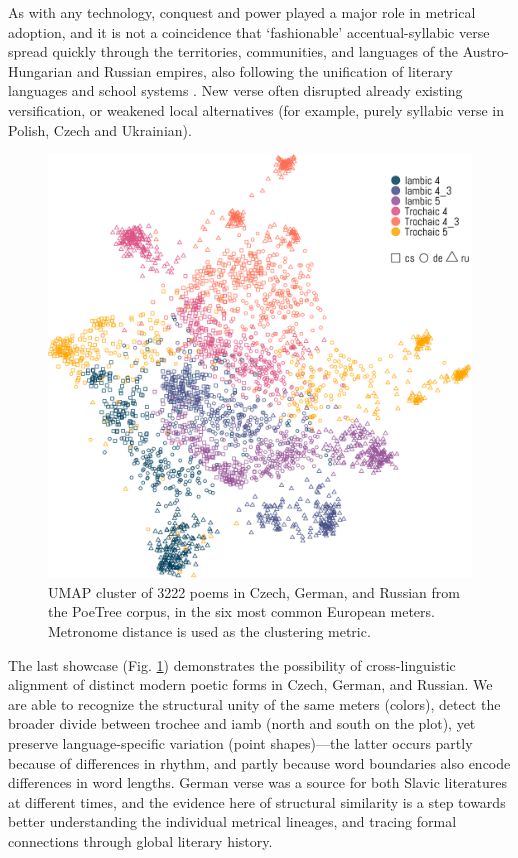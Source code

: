 \documentclass[
    hf
]{ceurart}
\begin{document}
As with any technology, conquest and power played a major role in metrical adoption, and it is not a coincidence that `fashionable' accentual-syllabic verse spread quickly through the territories, communities, and languages of the Austro-Hungarian and Russian empires, also following the unification of literary languages and school systems \cite[238-239]{gasparov_history_1996}. New verse often disrupted already existing versification, or weakened local alternatives (for example, purely syllabic verse in Polish, Czech and Ukrainian).

\begin{figure}
    \includegraphics[width=\linewidth]{figures/crosslang_cluster-crop.pdf}
    \caption{UMAP cluster of 3222 poems in Czech, German, and Russian from the PoeTree corpus, in the six most common European meters. Metronome distance is used as the clustering metric.}
    \label{fig:crosslang}
\end{figure}

The last showcase (Fig. \ref{fig:crosslang}) demonstrates the possibility of cross-linguistic alignment of distinct modern poetic forms in Czech, German, and Russian. We are able to recognize the structural unity of the same meters (colors), detect the broader divide between trochee and iamb (north and south on the plot), yet preserve language-specific variation (point shapes)---the latter occurs partly because of differences in rhythm, and partly because word boundaries also encode differences in word lengths. German verse was a source for both Slavic literatures at different times, and the evidence here of structural similarity is a step towards better understanding the individual metrical lineages, and tracing formal connections through global literary history.
\end{document}
